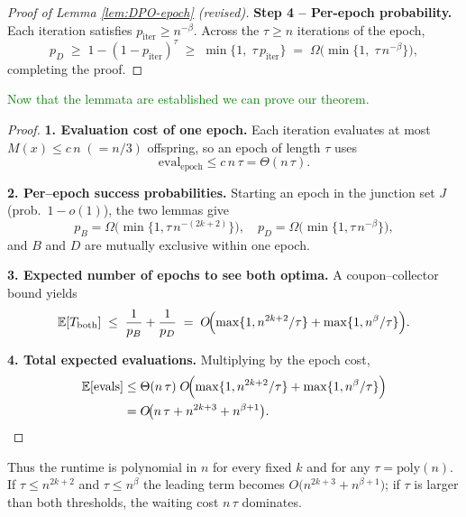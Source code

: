 \begin{proof}[Proof of Lemma \ref{lem:DPO-epoch} (revised)]
	\textbf{Step 4 – Per-epoch probability.}
	Each iteration satisfies \(p_{\text{iter}}\ge n^{-\beta}\).
	Across the \(\tau\ge n\) iterations of the epoch,
	\[
	p_D
	\;\ge\;
	1-(1-p_{\text{iter}})^{\tau}
	\;\ge\;
	\min\!\bigl\{1,\;\tau\,p_{\text{iter}}\bigr\}
	\;=\;
	\Omega\!\bigl(\min\{1,\;\tau\,n^{-\beta}\}\bigr),
	\]
	completing the proof.
\end{proof}

\textcolor{green}{Now that the lemmata are established we can prove our theorem.}
\begin{proof}
	\textbf{1.  Evaluation cost of one epoch.}
	Each iteration evaluates at most \(M(x)\le c\,n\;(=n/3)\) offspring, so an
	epoch of length \(\tau\) uses
	\[
	\text{eval}_{\text{epoch}}\le c\,n\,\tau=\Theta(n\,\tau).
	\]
	
	\textbf{2.  Per–epoch success probabilities.}
	Starting an epoch in the junction set \(J\) (prob.\ \(1-o(1)\)), the two
	lemmas give
	\[
	p_B=\Omega\!\bigl(\min\{1,\tau\,n^{-(2k+2)}\}\bigr),\quad
	p_D=\Omega\!\bigl(\min\{1,\tau\,n^{-\beta}\}\bigr),
	\]
	and \(B\) and \(D\) are mutually exclusive within one epoch.
	
	\textbf{3.  Expected number of epochs to see both optima.}
	A coupon–collector bound yields
	\[
	\mathbb{E}[T_{\mathrm{both}}]
	\;\le\;
	\frac1{p_B}+\frac1{p_D}
	\;=\;
	O\!\Bigl(
	\max\{1,n^{2k+2}/\tau\}
	+\max\{1,n^{\beta}/\tau\}
	\Bigr).
	\]
	
	\textbf{4.  Total expected evaluations.}
	Multiplying by the epoch cost,
	\begin{align*}
		\mathbb{E}[\text{evals}]
		&\le
		\Theta(n\,\tau)\;
		O\!\Bigl(
		\max\{1,n^{2k+2}/\tau\}
		+\max\{1,n^{\beta}/\tau\}
		\Bigr)
		\\&=
		O\!\bigl(
		n\,\tau
		+n^{2k+3}
		+n^{\beta+1}
		\bigr).
	\end{align*}
\end{proof}

Thus the runtime is polynomial in \(n\) for every fixed \(k\) and for any
\(\tau=\mathrm{poly}(n)\).  If \(\tau\le n^{2k+2}\) and
\(\tau\le n^{\beta}\) the leading term becomes
\(O\!\bigl(n^{2k+3}+n^{\beta+1}\bigr)\);  
if \(\tau\) is larger than both thresholds, the waiting cost \(n\,\tau\)
dominates.
